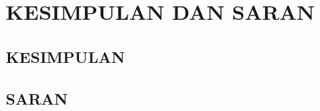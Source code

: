 \chapter{KESIMPULAN DAN SARAN}
\label{chap:kesimpulansaran}

\paragraphtextstyle
\renewcommand{\thesection}{4.\arabic{section}}

\section{KESIMPULAN}
\label{sec:kesimpulan}

\section{SARAN}
\label{sec:saran}
